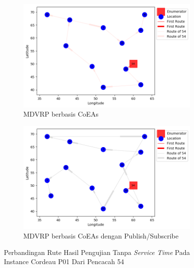 \begin{figure}[H]
	\centering
	\begin{subfigure}[t]{\textwidth}
		\centering
		\includegraphics[width=\textwidth]{Resources/Images/cordeau_p01/cordeau_p01_notw_54_coes}
		\caption{MDVRP berbasis CoEAs}
		\label{fig:cordeau_p01_notw_54_coes}
	\end{subfigure}
	\begin{subfigure}[t]{\textwidth}
		\centering
		\includegraphics[width=\textwidth]{Resources/Images/cordeau_p01/cordeau_p01_notw_54_pubsub_coes}
		\caption{MDVRP berbasis CoEAs dengan Publish/Subscribe}
		\label{fig:cordeau_p01_notw_54_pubsub_coes}
	\end{subfigure}
	\caption{Perbandingan Rute Hasil Pengujian Tanpa \textit{Service Time} Pada Instance Cordeau P01 Dari Pencacah 54}
	\label{fig:cordeau_p01_notw_54}
\end{figure}


